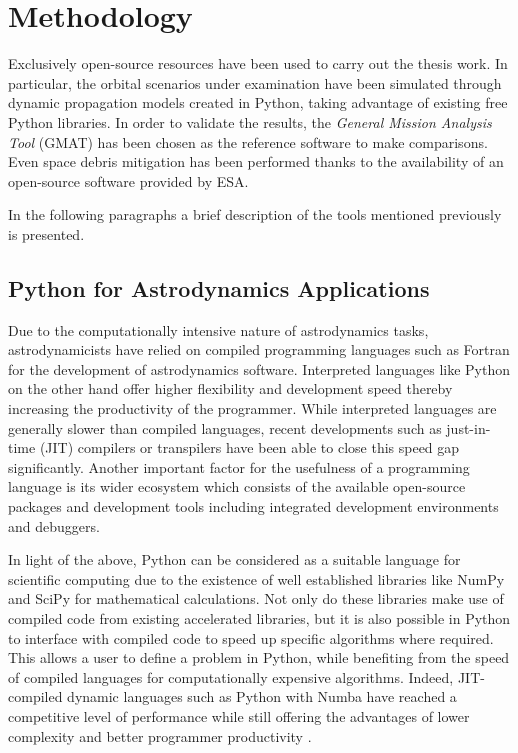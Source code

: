 \chapter{Methodology}

Exclusively open-source resources have been used to carry out the thesis work. 
In particular, the orbital scenarios under examination have been simulated through dynamic propagation models created in Python, taking advantage of existing free Python libraries.   
In order to validate the results, the \textit{General Mission Analysis Tool} (GMAT) has been chosen as the reference software to make comparisons.
Even space debris mitigation has been performed thanks to the availability of an open-source software provided by ESA.

In the following paragraphs a brief description of the tools mentioned previously is presented.

\section{Python for Astrodynamics Applications}

Due to the computationally intensive nature of astrodynamics tasks, astrodynamicists have relied on compiled programming languages such as Fortran for the development of astrodynamics software.
Interpreted languages like Python on the other hand offer higher flexibility and development speed thereby increasing the productivity of the programmer.
While interpreted languages are generally slower than compiled languages, recent developments such as just-in-time (JIT) compilers or transpilers have been able to close this speed gap significantly. 
Another important factor for the usefulness of a programming language is its wider ecosystem which consists of the available open-source packages and development tools including integrated development environments and debuggers. 

In light of the above, Python can be considered as a suitable language for scientific computing due to the existence of well established libraries like NumPy and SciPy for mathematical calculations.
Not only do these libraries make use of compiled code from existing accelerated libraries, but it is also possible in Python to interface with compiled code to speed up specific algorithms where required.
This allows a user to define a problem in Python, while benefiting from the speed of compiled languages for computationally expensive algorithms.
Indeed, JIT-compiled dynamic languages such as Python with Numba have reached a competitive level of performance while still offering the advantages of lower complexity and better programmer productivity
\cite{eichhorn2018comparative}.

